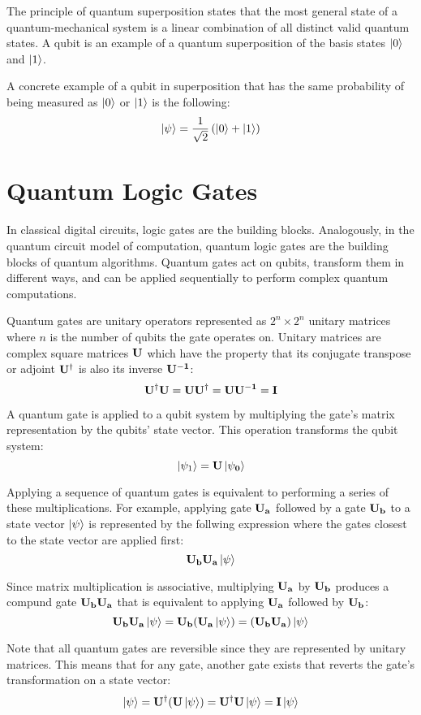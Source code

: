 The principle of quantum superposition states that the most general state of a quantum-mechanical system is a linear combination of all distinct valid quantum states. A qubit is an example of a quantum superposition of the basis states $\left|{0}\right\rangle$ and $\left|{1}\right\rangle$.

A concrete example of a qubit in superposition that has the same probability of being measured as $\left|{0}\right\rangle$ or $\left|{1}\right\rangle$ is the following:
$$\left|{\psi}\right\rangle=\frac{1}{\sqrt{2}}\left(\left|{0}\right\rangle+\left|{1}\right\rangle\right)$$


\section{Quantum Logic Gates}

In classical digital circuits, logic gates are the building blocks. Analogously, in the quantum circuit model of computation, quantum logic gates are the building blocks of quantum algorithms. Quantum gates act on qubits, transform them in different ways, and can be applied sequentially to perform complex quantum computations.

Quantum gates are unitary operators represented as $2^n \times 2^n$ unitary matrices where $n$ is the number of qubits the gate operates on. Unitary matrices are complex square matrices $\bf{U}$ which have the property that its conjugate transpose or adjoint $\bf{U^{\dagger}}$ is also its inverse $\bf{U^{-1}}$:
$$\bf{U^{\dagger}U}=\bf{UU^{\dagger}}=\bf{UU^{-1}}=I$$

A quantum gate is applied to a qubit system by multiplying the gate's matrix representation by the qubits' state vector. This operation transforms the qubit system:
$$\left|{\psi_1}\right\rangle=\bf{U}\left|{\psi_0}\right\rangle$$

Applying a sequence of quantum gates is equivalent to performing a series of these multiplications. For example, applying gate $\bf{U_a}$ followed by a gate $\bf{U_b}$ to a state vector $\left|{\psi}\right\rangle$ is represented by the follwing expression where the gates closest to the state vector are applied first:
$$\bf{U_b}\bf{U_a}\left|{\psi}\right\rangle$$

Since matrix multiplication is associative, multiplying $\bf{U_a}$ by $\bf{U_b}$ produces a compund gate $\bf{U_{b}U_{a}}$ that is equivalent to applying $\bf{U_a}$ followed by $\bf{U_b}$:
$$\bf{U_b}\bf{U_a}\left|{\psi}\right\rangle=\bf{U_b}(\bf{U_a}\left|{\psi}\right\rangle)=(\bf{U_b}\bf{U_a})\left|{\psi}\right\rangle$$

Note that all quantum gates are reversible since they are represented by unitary matrices. This means that for any gate, another gate exists that reverts the gate's transformation on a state vector:
$$\left|{\psi}\right\rangle=\bf{U^{\dagger}}(\bf{U}\left|{\psi}\right\rangle)=\bf{U^{\dagger}}\bf{U}\left|{\psi}\right\rangle=\bf{I}\left|{\psi}\right\rangle$$

